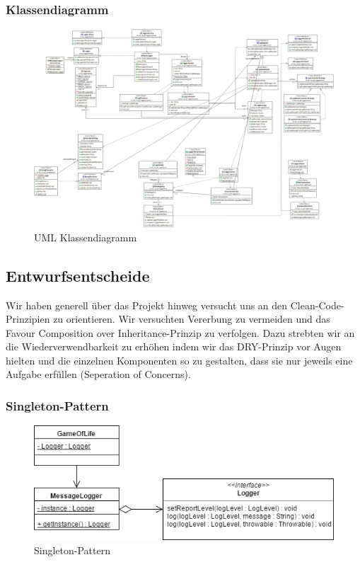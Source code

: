 \documentclass[12pt,a4paper,twosided]{scrartcl}
\begin{document}
\begin{landscape}
	\subsubsection{Klassendiagramm}
	\begin{figure}[h!]
		\centering
		\includegraphics[width=0.9\hsize]{img/UMLClassDiagram}
		\caption{UML Klassendiagramm}
		\label{fig:klassendiagramm}
		\vspace{-1cm}
	\end{figure}
\end{landscape}

\subsection{Entwurfsentscheide}
Wir haben generell über das Projekt hinweg versucht uns an den Clean-Code-Prinzipien zu orientieren. Wir versuchten Vererbung zu vermeiden und das \flqq Favour Composition over Inheritance\frqq -Prinzip zu verfolgen. Dazu strebten wir an die Wiederverwendbarkeit zu erhöhen indem wir das DRY-Prinzip vor Augen hielten und die einzelnen Komponenten so zu gestalten, dass sie nur jeweils eine Aufgabe erfüllen (Seperation of Concerns).

\subsubsection{Singleton-Pattern}
\begin{figure}[h]
	\centering
	\includegraphics[width=0.7\linewidth]{img/SingletonPattern}
	\caption{Singleton-Pattern}
	\label{fig:singletonpattern}
\end{figure}
\end{document}

